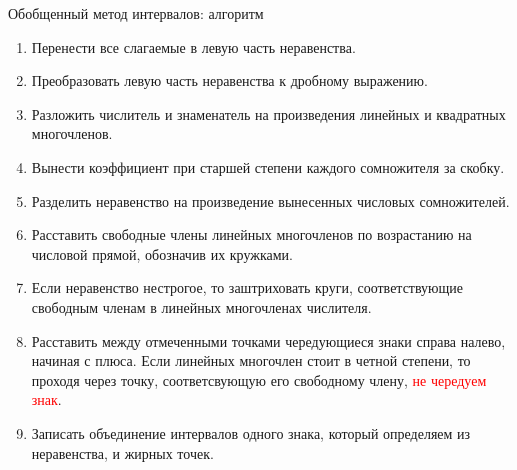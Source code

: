 \documentclass[algebra,a4paper]{pum}
\date{28.04.20}
\begin{document}
\begin{pumbox}{Обобщенный метод интервалов: алгоритм}
  \begin{enumerate}[label=\arabic*.]
    \item Перенести все слагаемые в левую часть неравенства.
    \item Преобразовать левую часть неравенства к дробному выражению.
    \item Разложить числитель и знаменатель на произведения линейных и квадратных многочленов.
    \item Вынести коэффициент при старшей степени каждого сомножителя за скобку.
    \item Разделить неравенство на произведение вынесенных числовых сомножителей.
    \item Расставить свободные члены линейных многочленов по возрастанию на числовой прямой, обозначив их кружками.
    \item Если неравенство нестрогое, то заштриховать круги, соответствующие свободным членам в линейных многочленах числителя.
    \item Расставить между отмеченными точками чередующиеся знаки справа налево, начиная с плюса. Если линейных многочлен стоит в четной степени, то проходя через точку, соответсвующую его свободному члену, \textcolor{red}{не чередуем знак}.
    \item Записать объединение интервалов одного знака, который определяем из неравенства, и жирных точек.
  \end{enumerate}
\end{pumbox}
\end{document}
